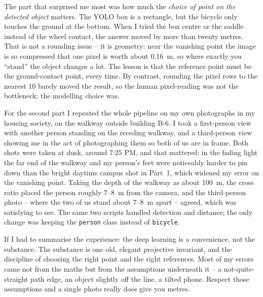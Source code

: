 \begin{studentSpace}
The part that surprised me most was how much the \emph{choice of point on
the detected object} matters. The YOLO box is a rectangle, but the
bicycle only touches the ground at the bottom. When I tried the box
centre or the saddle instead of the wheel contact, the answer moved by
more than twenty metres. That is not a rounding issue -- it is geometry:
near the vanishing point the image is so compressed that one pixel is
worth about 0.16~m, so where exactly you ``stand'' the object changes a
lot. The lesson is that the reference point must be the ground-contact
point, every time. By contrast, rounding the pixel rows to the nearest 10
barely moved the result, so the human pixel-reading was not the
bottleneck; the modelling choice was.

For the second part I repeated the whole pipeline on my own photographs
in my housing society, on the walkway outside building B-6. I took a
first-person view with another person standing on the receding walkway, and
a third-person view showing me in the act of photographing them so both
of us are in frame. Both shots were taken at dusk, around 7:25 PM, and
that mattered: in the fading light the far end of the walkway and my
person's feet were noticeably harder to pin down than the bright
daytime campus shot in Part~1, which widened my error on the vanishing
point. Taking the depth of the walkway as about 100~m, the cross ratio
placed the person roughly 7--8~m from the camera, and the third-person
photo -- where the two of us stand about 7--8~m apart -- agreed, which
was satisfying to see. The same two scripts handled detection and
distance; the only change was keeping the \texttt{person} class instead
of \texttt{bicycle}.

If I had to summarise the experience: the deep learning is a convenience,
not the substance. The substance is one old, elegant projective
invariant, and the discipline of choosing the right point and the right
references. Most of my errors came not from the maths but from the
assumptions underneath it -- a not-quite-straight path edge, an object
slightly off the line, a tilted phone. Respect those assumptions and a
single photo really does give you metres.
\end{studentSpace}
